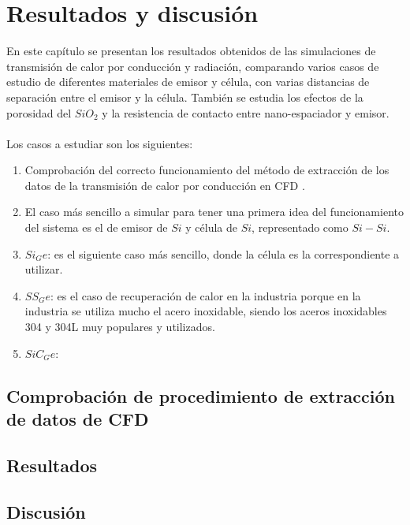 \chapter{Resultados y discusión}

En este capítulo se presentan los resultados obtenidos de las simulaciones de transmisión de calor por conducción y radiación, comparando varios casos de estudio de diferentes materiales de emisor y célula, con varias distancias de separación entre el emisor y la célula. También se estudia los efectos de la porosidad del $SiO_2$ y la resistencia de contacto entre nano-espaciador y emisor.\\\\
Los casos a estudiar son los siguientes:
\begin{enumerate}
	\item Comprobación del correcto funcionamiento del método de extracción de los datos de la transmisión de calor por conducción en CFD \label{res:comprobacionCFD}.
	\item El caso más sencillo a simular para tener una primera idea del funcionamiento del sistema es el de emisor de $Si$ y célula de $Si$, representado como $Si-Si$.\label{res:caso_Si_Si}
	\item $Si_Ge$: es el siguiente caso más sencillo, donde la célula es la correspondiente a utilizar.\label{res:caso_Si_Ge}
	\item $SS_Ge$: es el caso de recuperación de calor en la industria porque en la industria se utiliza mucho el acero inoxidable, siendo los aceros inoxidables 304 y 304L muy populares y utilizados.\label{res:caso_SS_Ge}
	\item $SiC_Ge$: 
\end{enumerate}
\section{Comprobación de procedimiento de extracción de datos de CFD}


\section{Resultados}
\begin{figure}
\end{figure}


\section{Discusión}